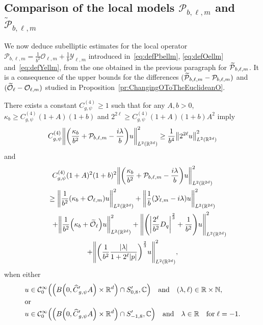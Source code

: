 \documentclass[10pt]{amsart}
\theoremstyle{definition}\newtheorem{defi}[theo]{Definition}\newtheorem{rema}[theo]{Remark}\newtheorem{exam}[theo]{Example}\newtheorem{exem}[theo]{Example}\newtheorem{nota}[theo]{Notation}
\newcommand{\C}{\mathbb{C}}
\newcommand{\R}{\mathbb{R}}
\newcommand{\N}{\mathbb{N}}
\newcommand{\clC}{\mathcal{C}}
\newcommand{\clY}{\mathcal{Y}}
\newcommand{\clO}{\mathcal{O}}
\newcommand{\clP}{\mathcal{P}}
\let\oldtilde\tilde
\renewcommand*{\tilde}[1]{\mathchoice{\widetilde{#1}}{\widetilde{#1}}{\oldtilde{#1}}{\oldtilde{#1}}}
\let\oldhat\hat
\renewcommand*{\hat}[1]{\mathchoice{\widehat{#1}}{\widehat{#1}}{\oldhat{#1}}{\oldhat{#1}}}
\let\originalleft\left
\let\originalright\right
\renewcommand{\left}{\mathopen{}\mathclose\bgroup\originalleft}
\renewcommand{\right}{\aftergroup\egroup\originalright}
\begin{document}
\subsection{Comparison of the local models \texorpdfstring{$\clP_{b,\ell,m}$}{P\_b,l,m} and \texorpdfstring{$\widetilde{\clP}_{b,\ell,m}$}{P\_b,l,m}}\label{subsec:compPbellmtPbellm}

We now deduce subelliptic estimates for the local operator $\clP_{b,\ell,m}=\frac{1}{b^2}\clO_{\ell,m}+\frac{1}{b}\clY_{\ell,m}$ introduced in~\eqref{eq:defPbellm}, \eqref{eq:defOellm} and~\eqref{eq:defYellm}, from the one obtained in the previous paragraph for $\tilde{\clP}_{b,\ell,m}$. It is a consequence of the upper bounds for the differences $(\tilde{\clP}_{b,\ell,m}-\clP_{b,\ell,m})$ and $(\tilde{\clO}_{\ell}-\clO_{\ell,m})$ studied in Proposition~\ref{pr:ChangingOToTheEuclideanO}.
\begin{prop}\label{pr:subellPbellm}
There exists a constant $C_{g,\psi}^{(4)}\geq 1$ such that for any $A,b>0$, $\kappa_b\geq C_{g,\psi}^{(4)}(1+A)(1+b)$ and $2^{2\ell}\geq C_{g,\psi}^{(4)}(1+A)(1+b)A^{2}$ imply
\begin{equation}\label{eq:subellPbellm1}
C_{g,\psi}^{(4)} \left\|\left(\frac{\kappa_b}{b^2}+\clP_{b,\ell,m}-\frac{i\lambda}{b}\right)u\right\|_{L^{2}(\R^{2d})}^2 \geq \frac{1}{b^4}\left\|2^{2\ell} u\right\|^2_{L^2(\R^{2d})}
\end{equation}
and
\begin{multline}\label{eq:subellPbellm2}
C_{g,\psi}^{(4)}(1+A)^2(1+b)^2
\left\| \left(\frac{\kappa_{b}}{b^{2}} + \clP_{b,\ell,m} - \frac{i\lambda}{b} \right) u \right\|_{L^2(\R^{2d})}^{2} \\
\geq \left\| \frac{1}{b^2}\left(\kappa_b+\clO_{\ell,m}\right) u\right\|_{L^2(\R^{2d})}^2 +
\left\| \frac{1}{b}\left(\clY_{\ell,m}-i \lambda \right)u \right\|_{L^2(\R^{2d})}^2
\\
\qquad+\left\| \frac{1}{b^2}\left(\kappa_b+\tilde{\clO}_{\ell}\right) u\right\|_{L^2(\R^{2d})}^2
+ \left\| \left(\left|\frac{2^{\ell}}{b^2}D_{q} \right|^{\frac{2}{3}} + \frac{1}{b^2}\right) u \right\|_{L^2(\R^{2d})}^{2}\\
+ \left\| \left(\frac{1}{b^2} \frac{|\lambda|}{1+2^{\ell}|p|} \right)^{\frac{2}{3}} u \right\|_{L^2(\R^{2d})}^{2} ,
\end{multline}
when either
\begin{align*}
&u \in \clC^\infty_0\left(\left(B\left(0,\hat{C}'_{g,\psi}A\right)\times \R^d\right)\cap S_{0,8}',\C\right)\quad\text{and}\quad (\lambda,\ell)\in \R\times \N,\\
\intertext{or}
&u \in \clC^\infty_0\left(\left(B\left(0,\hat{C}'_{g,\psi}A\right)\times \R^d\right)\cap S_{-1,8}',\C\right)\quad \text{and}\quad \lambda\in \R\quad\text{for}\; \ell=-1.
\end{align*}
\end{prop}
\end{document}
